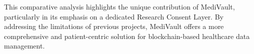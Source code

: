 This comparative analysis highlights the unique contribution of MediVault, particularly in its emphasis on a dedicated Research Consent Layer. By addressing the limitations of previous projects, MediVault offers a more comprehensive and patient-centric solution for blockchain-based healthcare data management.

